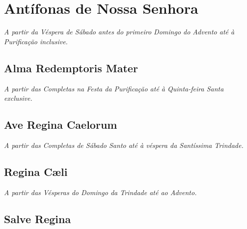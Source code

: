 \section{Antífonas de Nossa Senhora}\label{antifonasnossasenhora}

\textit{A partir da Véspera de Sábado antes do primeiro Domingo do Advento até à Purificação inclusive.}

\subsection{Alma Redemptoris Mater}\label{almaredemptorismater}


\textit{A partir das Completas na Festa da Purificação até à Quinta-feira Santa exclusive.}

\subsection{Ave Regina Caelorum}\label{avereginacaelorum}


\textit{A partir das Completas de Sábado Santo até à véspera da Santíssima Trindade.}

\subsection{Regina Cæli}\label{reginacaeli}


\textit{A partir das Vésperas do Domingo da Trindade até ao Advento.}

\subsection{Salve Regina}\label{salveregina}

